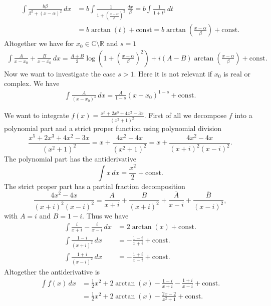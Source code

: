 \begin{align*}
\int \frac{b\beta}{\beta^{2}+(x-\alpha)^{2}}\, dx & = b\int \frac{1}{1+(\frac{x-\alpha}{\beta})^{2}}\, \frac{dx}{\beta}=b\int \frac{1}{1+t^{2}}\,dt\\
& = b \arctan(t) + \text{const} = b \arctan\left(\frac{x-\alpha}{\beta}\right) + \text{const}.
\end{align*}
Altogether we have for $x_{0}\in\mathbb{C}\setminus\mathbb{R}$ and $s=1$
\begin{align*}
\int \frac{A}{x-x_{0}}+\frac{B}{x-\overline{x_{0}}}\, dx = \frac{A+B}2\log\left(1+\left(\frac{x-\alpha}{\beta}\right)^{2}\right)+i(A-B)\arctan\left(\frac{x-\alpha}{\beta}\right) + \text{const}.
\end{align*}
Now we want to investigate the case $s>1$. Here it is not relevant if $x_{0}$ is real or complex. We have
\begin{align*}
\int \frac{A}{(x-x_{0})^{s}}\, dx = \frac{A}{1-s}(x-x_{0})^{1-s}+\text{const}.
\end{align*}
\begin{example}
We want to integrate $f(x)=\frac{x^{5}+2x^{3}+4x^{2}-3x}{(x^{2}+1)^{2}}$. First of all we decompose $f$ into a polynomial part and a strict proper function using polynomial division
$$
\frac{x^{5}+2x^{3}+4x^{2}-3x}{(x^{2}+1)^{2}} = x + \frac{4x^{2}-4x}{(x^{2}+1)^{2}} = x +  \frac{4x^{2}-4x}{(x+i)^{2}(x-i)^{2}}.
$$
The polynomial part has the antiderivative
$$
\int x\,dx = \frac{x^2}{2}+\text{const}.
$$
The strict proper part has a partial fraction decomposition
$$
\frac{4x^{2}-4x}{(x+i)^{2}(x-i)^{2}} = \frac{A}{x+i}+\frac{B}{(x+i)^{2}}+\frac{\overline{A}}{x-i}+\frac{\overline{B}}{(x-i)^{2}},
$$
with $A=i$ and $B=1-i$. Thus we have
\begin{align*}
\int \frac{i}{x+i} - \frac{i}{x-i}\, dx &= 2\arctan(x)+\text{const}.\\
\int \frac{1-i}{(x+i)^{2}}\,dx &= -\frac{1-i}{x+i}+\text{const}.\\
\int \frac{1+i}{(x-i)^{2}}\,dx &= -\frac{1+i}{x-i}+\text{const}.
\end{align*}
Altogether the antiderivative is
\begin{align*}
\int f(x)\, dx &= \frac12 x^2+2\arctan(x) -\frac{1-i}{x+i}-\frac{1+i}{x-i} + \text{const}.\\
&= \frac12 x^2+2\arctan(x)-\frac{2x-2}{x^{2}+1} + \text{const}.
\end{align*}
\end{example}

